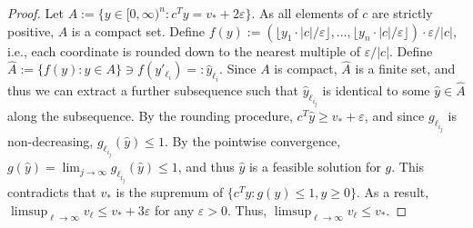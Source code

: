 \documentclass[10pt,a4paper]{amsart}
\begin{document}
\begin{proof}
    Let $A:=\{y\in[0,\infty)^n: c^Ty=v_\ast + 2\varepsilon\}$. As all elements of $c$ are strictly positive, $A$ is a compact set. 
    Define $f(y):=(\lfloor y_1\cdot |c|/\varepsilon\rfloor, \ldots, \lfloor y_n\cdot |c|/\varepsilon\rfloor)\cdot \varepsilon/|c|$, i.e., each coordinate is rounded down to the nearest multiple of $\varepsilon/|c|$. Define $\hat A:=\{f(y): y\in A\}\ni f(y'_{\ell_i})=: \hat y_{\ell_i}$. Since $A$ is compact, $\hat A$ is a finite set, and thus we can extract a further subsequence such that $\hat y_{\ell_{i_j}}$ is identical to some $\hat y\in \hat A$ along the subsequence. By the rounding procedure, $c^T \hat y\ge v_\ast+\varepsilon$, and since $g_{\ell_{i_j}}$ is non-decreasing, $g_{\ell_{i_j}}(\hat y)\le 1$. 
        By the pointwise convergence, $g(\hat y)=\lim_{j\to\infty}g_{\ell_{i_j}}(\hat y)\le 1$, and thus $\hat y$ is a feasible solution for $g$. This contradicts that $v_\ast$ is the supremum of $\{c^Ty: g(y)\le 1, y\ge 0\}$. As a result, $\limsup_{\ell\to\infty}v_\ell\le v_\ast+3\varepsilon$ for any $\varepsilon>0$. Thus, $\limsup_{\ell\to\infty}v_\ell\le v_\ast$. 
\end{proof} 
\end{document}
